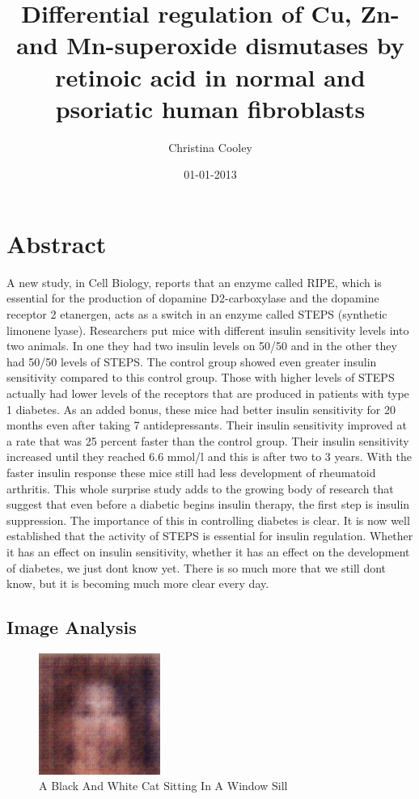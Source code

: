 \documentclass{article}%
\title{Differential regulation of Cu, Zn{-} and Mn{-}superoxide dismutases by retinoic acid in normal and psoriatic human fibroblasts}%
\author{Christina Cooley}%
\affil{Department of Laboratory Medicine, The First Affiliated Hospital of Sun Yat{-}sen University, Guangzhou, Guangdong, China}%
\date{01{-}01{-}2013}%
\begin{document}
%
\normalsize%
\maketitle%
\section{Abstract}%
\label{sec:Abstract}%
A new study, in Cell Biology, reports that an enzyme called RIPE, which is essential for the production of dopamine D2{-}carboxylase and the dopamine receptor 2 etanergen, acts as a switch in an enzyme called STEPS (synthetic limonene lyase). Researchers put mice with different insulin sensitivity levels into two animals. In one they had two insulin levels on 50/50 and in the other they had 50/50 levels of STEPS. The control group showed even greater insulin sensitivity compared to this control group. Those with higher levels of STEPS actually had lower levels of the receptors that are produced in patients with type 1 diabetes.\newline%
As an added bonus, these mice had better insulin sensitivity for 20 months even after taking 7 antidepressants. Their insulin sensitivity improved at a rate that was 25 percent faster than the control group. Their insulin sensitivity increased until they reached 6.6 mmol/l and this is after two to 3 years. With the faster insulin response these mice still had less development of rheumatoid arthritis.\newline%
This whole surprise study adds to the growing body of research that suggest that even before a diabetic begins insulin therapy, the first step is insulin suppression. The importance of this in controlling diabetes is clear. It is now well established that the activity of STEPS is essential for insulin regulation. Whether it has an effect on insulin sensitivity, whether it has an effect on the development of diabetes, we just dont know yet. There is so much more that we still dont know, but it is becoming much more clear every day.

%
\subsection{Image Analysis}%
\label{subsec:ImageAnalysis}%


\begin{figure}[h!]%
\centering%
\includegraphics[width=150px]{500_fake_images/samples_5_193.png}%
\caption{A Black And White Cat Sitting In A Window Sill}%
\end{figure}

%
\end{document}
